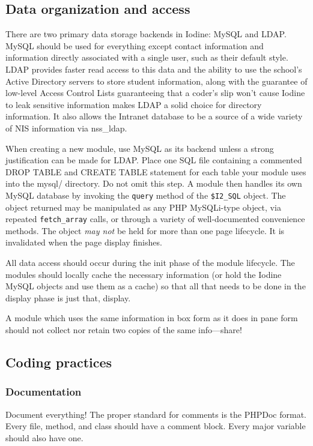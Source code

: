 \documentclass[11pt,letterpaper]{report}
\begin{document}
\subsection{Data organization and access}
There are two primary data storage backends in Iodine: MySQL and LDAP.
MySQL should be used for everything except contact information and information
directly associated with a single user, such as their default style.  LDAP
provides faster read access to this data and the ability to use the school's
Active Directory servers to store student information, along with the
guarantee of low-level Access Control Lists guaranteeing that a coder's slip
won't cause Iodine to leak sensitive information makes LDAP a solid choice
for directory information.  It also allows the Intranet database to be a
source of a wide variety of NIS information via nss\_ldap.

When creating a new module, use MySQL as its backend unless a strong
justification can be made for LDAP.  Place one SQL file containing a
commented DROP TABLE and CREATE TABLE statement for each table your module
uses into the mysql/ directory.  Do not omit this step.  A module then handles
its own MySQL database by invoking the \lstinline{query} method of the \lstinline{$I2_SQL}
object.  The object returned may be manipulated as any PHP MySQLi-type object,
via repeated \lstinline{fetch_array} calls, or through a variety of well-documented
convenience methods.  The object \emph{may not} be held for more than one
page lifecycle.  It is invalidated when the page display finishes.

All data access should occur during the init phase of the module lifecycle.
The modules should locally cache the necessary information (or hold the Iodine
MySQL objects and use them as a cache) so that all that needs to be done in
the display phase is just that, display.

A module which uses the same information in box form as it does in pane form
should not collect nor retain two copies of the same info---share!
\subsection{Coding practices}
\subsubsection{Documentation}
Document everything!  The proper standard for comments is the PHPDoc format.  Every file, method, and class should have a comment block.
Every major variable should also have one.
\end{document}
